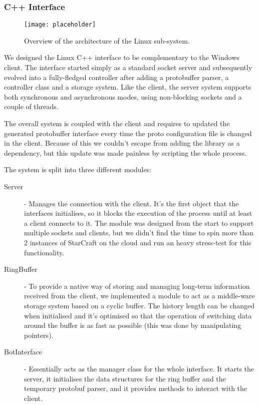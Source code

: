 \subsubsection{C++ Interface}

\begin{figure}[h]
    \centering
    \texttt{[image: placeholder]}
    \caption{Overview of the architecture of the Linux sub-system.}
    \label{fig:arch_linux}
\end{figure}

We designed the Linux C++ interface to be complementary to the Windows client.
The interface started simply as a standard socket server and subsequently
evolved into a fully-fledged controller after adding a protobuffer parser, a
controller class and a storage system. Like the client, the server system
supports both synchronous and asynchronous modes, using non-blocking sockets and
a couple of threads.

The overall system is coupled with the client and requires to updated the
generated protobuffer interface every time the proto configuration file is
changed in the client. Because of this we couldn't escape from adding the
library as a dependency, but this update was made painless by scripting the
whole process.

The system is split into three different modules:
\begin{description}
\item [Server] - Manages the connection with the client. It's the first object
  that the interfaces initialises, so it blocks the execution of the process
  until at least a client connects to it. The module was designed from the start
  to support multiple sockets and clients, but we didn't find the time to spin
  more than 2 instances of StarCraft on the cloud and run an heavy stress-test
  for this functionality.
\item [RingBuffer] - To provide a native way of storing and managing long-term
  information received from the client, we implemented a module to act as a
  middle-ware storage system based on a cyclic buffer. The history length can be
  changed when initialised and it's optimised so that the operation of switching
  data around the buffer is as fast as possible (this was done by manipulating
  pointers).
\item [BotInterface] - Essentially acts as the manager class for the whole interface.
  It starts the server, it initialises the data structures for the ring buffer
  and the temporary protobuf parser, and it provides methods to interact with
  the client.
\end{description}

